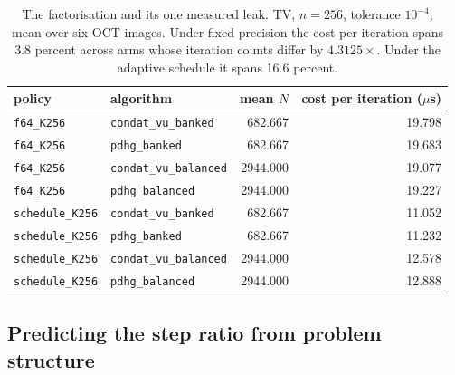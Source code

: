 \begin{table}[t]
\centering
\caption{The factorisation and its one measured leak. TV, $n{=}256$, tolerance
$10^{-4}$, mean over six OCT images. Under fixed precision the cost per
iteration spans 3.8 percent across arms whose iteration counts differ by
$4.3125\times$. Under the adaptive schedule it spans 16.6 percent.}
\label{tab:leak}
\begin{tabular}{llrr}
\toprule
policy & algorithm & mean $N$ & cost per iteration ($\mu$s) \\
\midrule
\texttt{f64\_K256} & \texttt{condat\_vu\_banked}   & 682.667  & 19.798 \\
\texttt{f64\_K256} & \texttt{pdhg\_banked}         & 682.667  & 19.683 \\
\texttt{f64\_K256} & \texttt{condat\_vu\_balanced} & 2944.000 & 19.077 \\
\texttt{f64\_K256} & \texttt{pdhg\_balanced}       & 2944.000 & 19.227 \\
\midrule
\texttt{schedule\_K256} & \texttt{condat\_vu\_banked}   & 682.667  & 11.052 \\
\texttt{schedule\_K256} & \texttt{pdhg\_banked}         & 682.667  & 11.232 \\
\texttt{schedule\_K256} & \texttt{condat\_vu\_balanced} & 2944.000 & 12.578 \\
\texttt{schedule\_K256} & \texttt{pdhg\_balanced}       & 2944.000 & 12.888 \\
\bottomrule
\end{tabular}
\end{table}

\subsection{Predicting the step ratio from problem structure}

